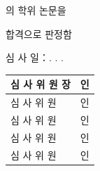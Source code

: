 \thispagestyle{empty}
\begin{center}
  \vspace*{5mm}

  {\fontsize{20}{26}\selectfont \authorname 의 \degreetype 학위 논문을}

  \vspace{5mm}

  {\fontsize{20}{26}\selectfont 합격으로 판정함}

  \vspace{18mm}

  {\fontsize{14}{18}\selectfont 심 사 일：\submityear. \submitmonth. \submitdate.}

  \vspace{28mm}

  \begin{tabular}{p{}p{}}
    {\fontsize{14}{18}\selectfont 심 사 위 원 장} & {\fontsize{14}{18}\selectfont 인} \\ \hline\noalign{\vspace{4mm}}
    {\fontsize{14}{18}\selectfont 심 사 \; 위 \; 원} & {\fontsize{14}{18}\selectfont 인} \\ \hline\noalign{\vspace{4mm}}
    {\fontsize{14}{18}\selectfont 심 사 \; 위 \; 원} & {\fontsize{14}{18}\selectfont 인} \\ \hline\noalign{\vspace{4mm}}
    {\fontsize{14}{18}\selectfont 심 사 \; 위 \; 원} & {\fontsize{14}{18}\selectfont 인} \\ \hline\noalign{\vspace{4mm}}
    {\fontsize{14}{18}\selectfont 심 사 \; 위 \; 원} & {\fontsize{14}{18}\selectfont 인} \\ \hline
\end{tabular}

  \vspace{40mm}

  {\fontsize{20}{26}\selectfont \gradschool}
\end{center}
\newpage
